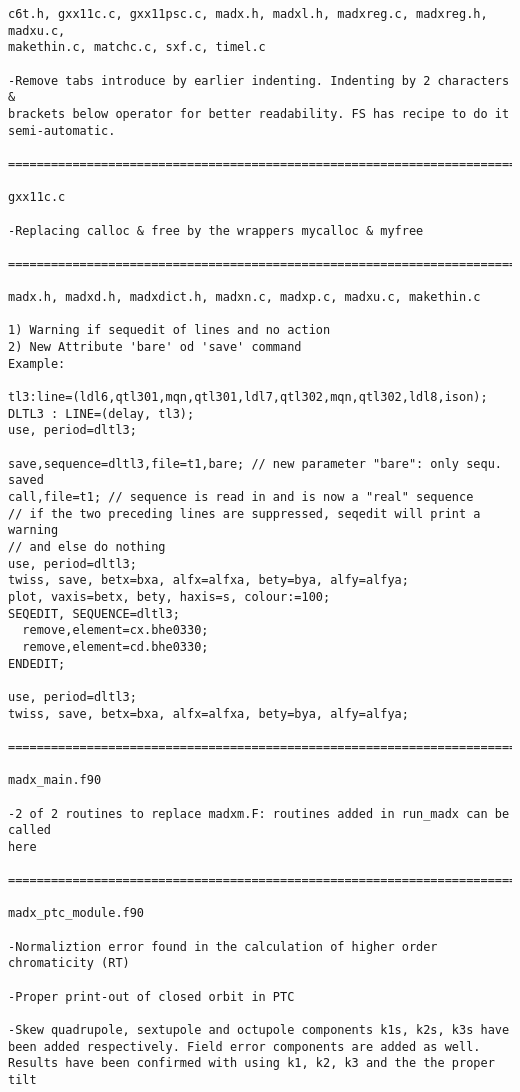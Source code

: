 \begin{verbatim}
c6t.h, gxx11c.c, gxx11psc.c, madx.h, madxl.h, madxreg.c, madxreg.h, madxu.c,
makethin.c, matchc.c, sxf.c, timel.c

-Remove tabs introduce by earlier indenting. Indenting by 2 characters &
brackets below operator for better readability. FS has recipe to do it
semi-automatic.

=============================================================================

gxx11c.c

-Replacing calloc & free by the wrappers mycalloc & myfree

=============================================================================

madx.h, madxd.h, madxdict.h, madxn.c, madxp.c, madxu.c, makethin.c

1) Warning if sequedit of lines and no action
2) New Attribute 'bare' od 'save' command
Example:

tl3:line=(ldl6,qtl301,mqn,qtl301,ldl7,qtl302,mqn,qtl302,ldl8,ison);
DLTL3 : LINE=(delay, tl3);
use, period=dltl3;

save,sequence=dltl3,file=t1,bare; // new parameter "bare": only sequ. saved
call,file=t1; // sequence is read in and is now a "real" sequence
// if the two preceding lines are suppressed, seqedit will print a warning
// and else do nothing
use, period=dltl3;
twiss, save, betx=bxa, alfx=alfxa, bety=bya, alfy=alfya;
plot, vaxis=betx, bety, haxis=s, colour:=100;
SEQEDIT, SEQUENCE=dltl3;
  remove,element=cx.bhe0330;
  remove,element=cd.bhe0330;
ENDEDIT;

use, period=dltl3;
twiss, save, betx=bxa, alfx=alfxa, bety=bya, alfy=alfya;

=============================================================================

madx_main.f90

-2 of 2 routines to replace madxm.F: routines added in run_madx can be called
here

=============================================================================

madx_ptc_module.f90

-Normaliztion error found in the calculation of higher order chromaticity (RT)

-Proper print-out of closed orbit in PTC

-Skew quadrupole, sextupole and octupole components k1s, k2s, k3s have
been added respectively. Field error components are added as well.
Results have been confirmed with using k1, k2, k3 and the the proper tilt


\end{verbatim}
